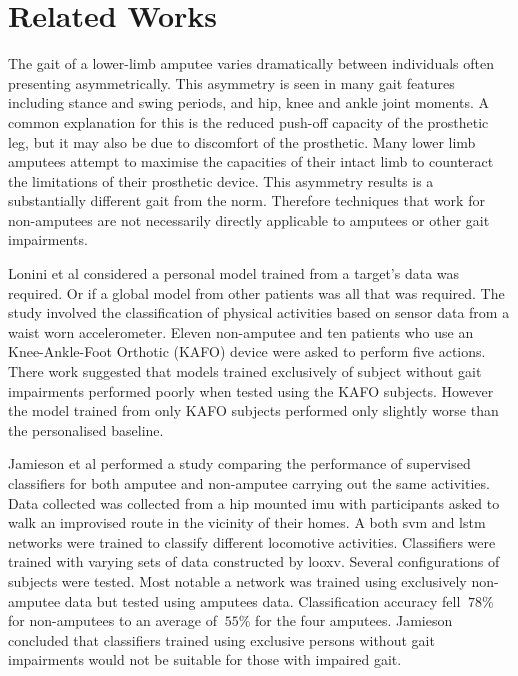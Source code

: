 \section{Related Works}
\label{sec:amputee-related-works}
The gait of a lower-limb amputee varies dramatically between individuals\cite{Lonini2016} often presenting asymmetrically\cite{Roerdink2012}. This asymmetry is seen in many gait features including stance and swing periods, and hip, knee and ankle joint moments\cite{Adamczyk2015, Harandi2020}. A common explanation for this is the reduced push-off capacity of the prosthetic leg, but it may also be due to discomfort of the prosthetic\cite{Hak2014}. Many lower limb amputees attempt to maximise the capacities of their intact limb to counteract the limitations of their prosthetic device\cite{Ochoa-Diaz2020}. This asymmetry results is a substantially different gait from the norm. Therefore techniques that work for non-amputees are not necessarily directly applicable to amputees or other gait impairments\cite{Jamieson2021}.

Lonini et al considered a personal model trained from a target's data was required. Or if a global model from other patients was all that was required. The study involved the classification of physical activities based on sensor data from a waist worn accelerometer.  Eleven non-amputee and ten patients who use an Knee-Ankle-Foot Orthotic (KAFO) device were asked to perform five actions. There work suggested that models trained exclusively of subject without gait impairments performed poorly when tested using the KAFO subjects. However the model trained from only KAFO subjects performed only slightly worse than the personalised baseline.\cite{Lonini2016}

Jamieson et al performed a study comparing the performance of supervised classifiers for both amputee and non-amputee carrying out the same activities. Data collected was collected from a hip mounted \acrshort{imu} with participants asked to walk an improvised route in the vicinity of their homes. A both \acrfull{svm} and \acrshort{lstm} networks were trained to classify different locomotive activities. Classifiers were trained with varying sets of data constructed by \acrfull{looxv}. Several configurations of subjects were tested. Most notable a network was trained using exclusively non-amputee data but tested using amputees data. Classification accuracy fell $~78\%$ for non-amputees to an average of $~55\%$ for the four amputees. Jamieson concluded that classifiers trained using exclusive persons without gait impairments would not be suitable for those with impaired gait.\cite{Jamieson2021}

